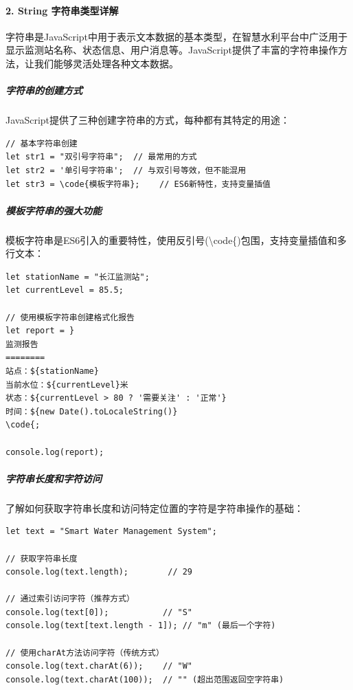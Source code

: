 \hypertarget{string-ux5b57ux7b26ux4e32ux7c7bux578bux8be6ux89e3}{%
\paragraph{2. String 字符串类型详解}\label{string-ux5b57ux7b26ux4e32ux7c7bux578bux8be6ux89e3}}

字符串是JavaScript中用于表示文本数据的基本类型，在智慧水利平台中广泛用于显示监测站名称、状态信息、用户消息等。JavaScript提供了丰富的字符串操作方法，让我们能够灵活处理各种文本数据。

\hypertarget{ux5b57ux7b26ux4e32ux7684ux521bux5efaux65b9ux5f0f}{%
\subparagraph{字符串的创建方式}\label{ux5b57ux7b26ux4e32ux7684ux521bux5efaux65b9ux5f0f}}

JavaScript提供了三种创建字符串的方式，每种都有其特定的用途：

\begin{lstlisting}[style=javascript]
// 基本字符串创建
let str1 = "双引号字符串";  // 最常用的方式
let str2 = '单引号字符串';  // 与双引号等效，但不能混用
let str3 = \code{模板字符串};    // ES6新特性，支持变量插值
\end{lstlisting}

\hypertarget{ux6a21ux677fux5b57ux7b26ux4e32ux7684ux5f3aux5927ux529fux80fd}{%
\subparagraph{模板字符串的强大功能}\label{ux6a21ux677fux5b57ux7b26ux4e32ux7684ux5f3aux5927ux529fux80fd}}

模板字符串是ES6引入的重要特性，使用反引号(\textbackslash code\{)包围，支持变量插值和多行文本：

\begin{lstlisting}[style=javascript]
let stationName = "长江监测站";
let currentLevel = 85.5;

// 使用模板字符串创建格式化报告
let report = }
监测报告
========
站点：${stationName}
当前水位：${currentLevel}米
状态：${currentLevel > 80 ? '需要关注' : '正常'}
时间：${new Date().toLocaleString()}
\code{;

console.log(report);
\end{lstlisting}

\hypertarget{ux5b57ux7b26ux4e32ux957fux5ea6ux548cux5b57ux7b26ux8bbfux95ee}{%
\subparagraph{字符串长度和字符访问}\label{ux5b57ux7b26ux4e32ux957fux5ea6ux548cux5b57ux7b26ux8bbfux95ee}}

了解如何获取字符串长度和访问特定位置的字符是字符串操作的基础：

\begin{lstlisting}[style=javascript]
let text = "Smart Water Management System";

// 获取字符串长度
console.log(text.length);        // 29

// 通过索引访问字符（推荐方式）
console.log(text[0]);           // "S"
console.log(text[text.length - 1]); // "m" (最后一个字符)

// 使用charAt方法访问字符（传统方式）
console.log(text.charAt(6));    // "W"
console.log(text.charAt(100));  // "" (超出范围返回空字符串)
\end{lstlisting}

